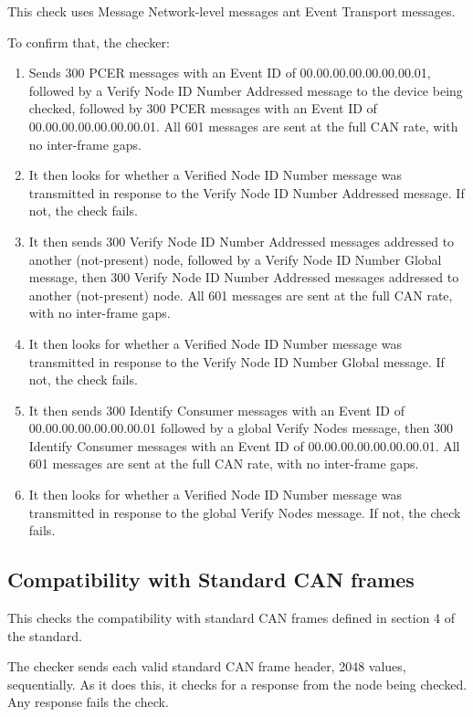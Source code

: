 This check uses Message Network-level
messages ant Event Transport messages.

To confirm that, the checker:

\begin{enumerate}
    \item Sends 300 PCER messages with an Event ID of 
        00.00.00.00.00.00.00.01, followed by a Verify Node ID Number Addressed 
        message to the device being checked,
        followed by 300 PCER messages with an Event ID of 
        00.00.00.00.00.00.00.01. 
        All 601 messages are sent at the full CAN rate, with no inter-frame gaps.
    \item It then looks for whether a Verified Node ID Number message was transmitted in
        response to the Verify Node ID Number Addressed message. If not, the check fails.
    \item It then sends 300 Verify Node ID Number Addressed messages addressed 
        to another (not-present) node,
        followed by a Verify Node ID Number Global message, 
        then 300 Verify Node ID Number Addressed messages
        addressed to another (not-present) node.
        All 601 messages are sent at the full CAN rate, with no inter-frame gaps.
    \item It then looks for whether a Verified Node ID Number message was transmitted in
        response to the Verify Node ID Number Global message. If not, the check fails.
    \item It then sends 300 Identify Consumer messages with an Event ID of 
        00.00.00.00.00.00.00.01
        followed by a global Verify Nodes message, then 
        300 Identify Consumer messages with an Event ID of 
        00.00.00.00.00.00.00.01.
        All 601 messages are sent at the full CAN rate, with no inter-frame gaps.
    \item It then looks for whether a Verified Node ID Number message was transmitted in
        response to the global Verify Nodes message. If not, the check fails.
\end{enumerate}

\subsection{Compatibility with Standard CAN frames}

This checks the compatibility with standard CAN frames defined in section 4 of the standard.

The checker sends each valid standard CAN frame header, 2048 values, sequentially.
As it does this, it checks for a response from the node being checked.  Any response 
fails the check.

  

